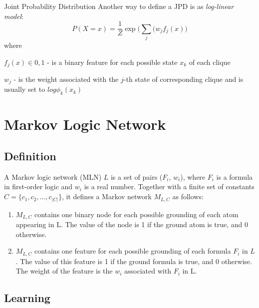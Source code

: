 \documentclass{beamer}
\begin{document}
\begin{frame}{Joint Probability Distribution}
  Another way to define a JPD is as \textit{log-linear model}:
  \begin{equation}
    P(X=x) = \frac{1}{Z}\exp\Big(\sum_j(w_jf_j(x)\Big)
  \end{equation}
  where

  $f_j(x) \in {0, 1}$ - is a binary feature for each possible state $x_{k}$ of
  each clique

  $w_j$ - is the weight associated with the $j$-th state of
  corresponding clique and is usually set to $log\phi_k(x_k)$
\end{frame}

\section{Markov Logic Network}
\subsection{Definition}
\begin{frame}[fragile]{\insertsubsection}
  \begin{definition}
    A Markov logic network (MLN) $L$ is a set of pairs ($F_i$, $w_i$),
    where $F_i$ is a formula in first-order logic and $w_i$ is a real
    number.  Together with a finite set of constants $C = \{c_1, c_2,
    ..., c_{|C|}\}$, it defines a Markov network $M_{L,C}$ as follows:
      \begin{enumerate}
      \item $M_{L,C}$ contains one binary node for each possible
        grounding of each atom appearing in L.  The value of the node
        is 1 if the ground atom is true, and 0 otherwise.

      \item $M_{L,C}$ contains one feature for each possible grounding
        of each formula $F_i$ in $L$.  The value of this feature is 1
        if the ground formula is true, and 0 otherwise.  The weight of
        the feature is the $w_i$ associated with $F_i$ in
        L.\cite{Domingos-06}
      \end{enumerate}
  \end{definition}
\end{frame}

\subsection{Learning}
\begin{frame}{\insertsubsection}
\end{frame}
\end{document}
